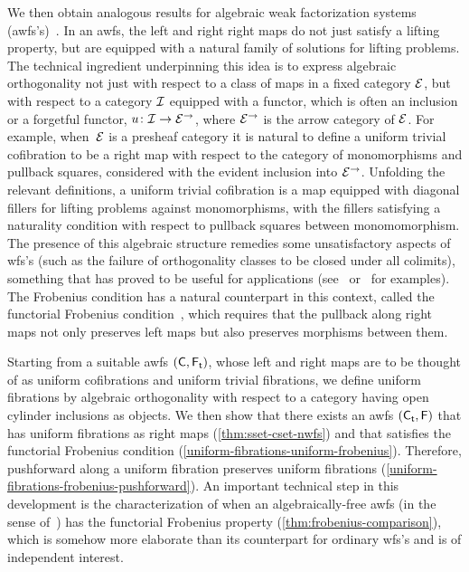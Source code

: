 \documentclass[reqno,10pt,a4paper,oneside,draft]{amsart}
\begin{document}
We then obtain analogous results for algebraic weak factorization systems (awfs's)~\cite{garner:small-object-argument,grandis-tholen-nwfs}.
In an awfs, the left and right right maps do not just satisfy a lifting property, but are equipped with a natural family of solutions for lifting problems.
The technical ingredient underpinning this idea is to express algebraic orthogonality not just with respect to a class of maps in a fixed category $\cal{E}$, but with respect to a category $\cal{I}$ equipped with a functor, which is often an inclusion or a forgetful functor, $u \co \cal{I} \to \cal{E}^\to$, where $\cal{E}^\to$ is the arrow category of $\cal{E}$.
For example, when~$\cal{E}$ is a presheaf category it is natural to define a uniform trivial cofibration to be a right map with respect to the category of monomorphisms and pullback squares, considered with the evident inclusion into $\cal{E}^\to$.
Unfolding the relevant definitions, a uniform trivial cofibration is a map equipped with diagonal fillers for lifting problems against monomorphisms, with the fillers satisfying a naturality condition with respect to pullback squares between monomomorphism.
The presence of this algebraic structure remedies some unsatisfactory aspects of wfs's (such as the failure of orthogonality classes to be closed under all colimits), something that has proved to be useful for applications (see~\cite{batanin-cisinski-weber,garner:globular-operator-awfs,garner-homomorphisms} or~\cite{awodey-cubical,coquand-cubical-sets,cohen-et-al:cubicaltt,pitts-cubical-nominal,swan-awfs} for examples).
The Frobenius condition has a natural counterpart in this context, called the functorial Frobenius condition~\cite{garner:topological-simplicial}, which requires that the pullback along right maps not only preserves left maps but also preserves morphisms between them.

Starting from a suitable awfs $(\CC, \TF)$, whose left and right maps are to be thought of as uniform cofibrations and uniform trivial fibrations, we define uniform fibrations by algebraic orthogonality with respect to a category having open cylinder inclusions as objects.
We then show that there exists an awfs $(\TC, \FF)$ that has uniform fibrations as right maps (\cref{thm:sset-cset-nwfs}) and that satisfies the functorial Frobenius condition (\cref{uniform-fibrations-uniform-frobenius}).
Therefore, pushforward along a uniform fibration preserves uniform fibrations (\cref{uniform-fibrations-frobenius-pushforward}).
An important technical step in this development is the characterization of when an algebraically-free awfs (in the sense of~\cite{garner:small-object-argument}) has the functorial Frobenius property (\cref{thm:frobenius-comparison}), which is somehow more elaborate than its counterpart for ordinary wfs's and is of independent interest.
\end{document}
